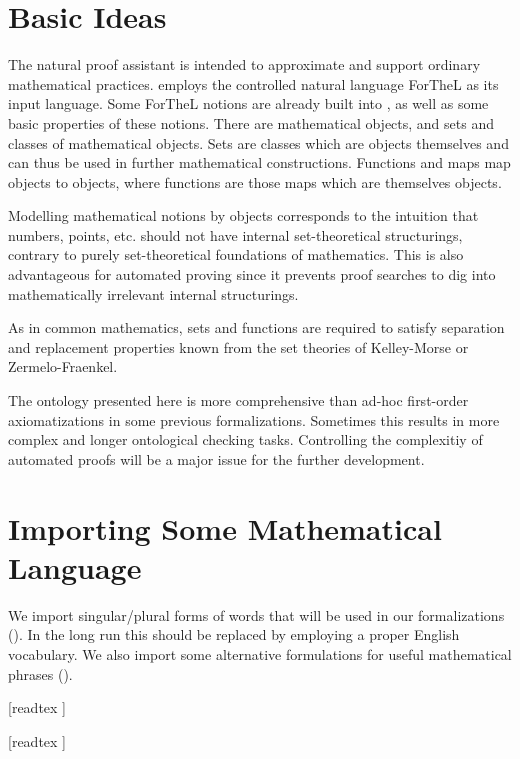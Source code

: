 \documentclass{article}
\begin{document}
\section{Basic Ideas}

The natural proof assistant \Naproche is intended to
approximate and support ordinary mathematical practices.
\Naproche employs the controlled natural language ForTheL
as its input language. Some ForTheL notions are already
built into \Naproche, as well as some basic properties of
these notions.
There are
mathematical objects, and sets and classes of mathematical
objects. Sets are classes which are objects themselves and
can thus be used in further mathematical constructions. Functions
and maps map objects to objects, where functions are those
maps which are themselves objects.

Modelling mathematical notions by objects corresponds
to the intuition that numbers, points, etc. should
not have internal set-theoretical
structurings, contrary to purely set-theoretical
foundations of mathematics. This is also advantageous
for automated proving since it prevents proof searches to
dig into mathematically irrelevant internal structurings.

As in common mathematics, sets and functions are required to
satisfy separation and replacement properties known from the
set theories of Kelley-Morse or Zermelo-Fraenkel.

The ontology presented here is more comprehensive than
ad-hoc first-order axiomatizations in some previous
\Naproche formalizations. Sometimes
this results in more complex and longer ontological checking tasks.
Controlling the complexitiy of automated proofs will be a major
issue for the further development.


\section{Importing Some Mathematical Language}

We import singular/plural forms of words that will be used in
our formalizations ().
In the long run this should be replaced by
employing a proper English vocabulary. We also
import some alternative formulations for
useful mathematical phrases ().

\begin{forthel}

  [readtex ]

  [readtex ]
\end{forthel}
\end{document}

